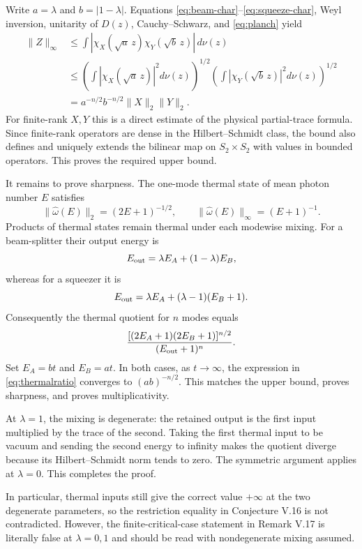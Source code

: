 \documentclass[11pt]{article}
\begin{document}
Write $a=\lambda$ and $b=|1-\lambda|$.  Equations
\eqref{eq:beam-char}--\eqref{eq:squeeze-char}, Weyl inversion, unitarity of
$D(z)$, Cauchy--Schwarz, and \eqref{eq:planch} yield
\begin{align*}
 \|Z\|_\infty
 &\le \int |\chi_X(\sqrt a\,z)\chi_Y(\sqrt b\,z)|\,d\nu(z)\\
 &\le
 \left(\int|\chi_X(\sqrt a\,z)|^2d\nu(z)\right)^{1/2}
 \left(\int|\chi_Y(\sqrt b\,z)|^2d\nu(z)\right)^{1/2}\\
 &=a^{-n/2}b^{-n/2}\|X\|_2\|Y\|_2.
\end{align*}
For finite-rank $X,Y$ this is a direct estimate of the physical partial-trace
formula.  Since finite-rank operators are dense in the Hilbert--Schmidt class,
the bound also defines and uniquely extends the bilinear map on
$S_2\times S_2$ with values in bounded operators.  This proves the required
upper bound.

It remains to prove sharpness.  The one-mode thermal state of mean photon
number $E$ satisfies
\[
 \|\widehat\omega(E)\|_2=(2E+1)^{-1/2},
 \qquad
 \|\widehat\omega(E)\|_\infty=(E+1)^{-1}.
\]
Products of thermal states remain thermal under each modewise mixing.  For a
beam-splitter their output energy is
\[
 E_{\rm out}=\lambda E_A+(1-\lambda)E_B,
\]
whereas for a squeezer it is
\[
 E_{\rm out}=\lambda E_A+(\lambda-1)(E_B+1).
\]
Consequently the thermal quotient for $n$ modes equals
\begin{equation}\label{eq:thermalratio}
 \frac{[(2E_A+1)(2E_B+1)]^{n/2}}{(E_{\rm out}+1)^n}.
\end{equation}
Set $E_A=bt$ and $E_B=at$.  In both cases, as $t\to\infty$,
the expression in \eqref{eq:thermalratio} converges to
$(ab)^{-n/2}$.  This matches the upper bound, proves sharpness, and proves
multiplicativity.

At $\lambda=1$, the mixing is degenerate: the retained output is the first
input multiplied by the trace of the second.  Taking the first thermal input
to be vacuum and sending the second energy to infinity makes the quotient
diverge because its Hilbert--Schmidt norm tends to zero.  The symmetric
argument applies at $\lambda=0$.  This completes the proof.

In particular, thermal inputs still give the correct value $+\infty$ at the
two degenerate parameters, so the restriction equality in Conjecture V.16 is
not contradicted.  However, the finite-critical-case statement in Remark V.17
is literally false at $\lambda=0,1$ and should be read with nondegenerate
mixing assumed.
\end{document}
